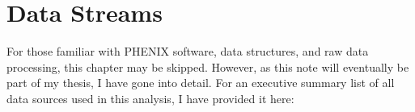 
\chapter{Data Streams}
\label{ch:DataStreams}

For those familiar with PHENIX software, data structures, and raw data processing, this
chapter may be skipped. However, as this note will eventually be part of my thesis, I have
gone into detail. For an executive summary list of all data sources used in this analysis,
I have provided it here:

